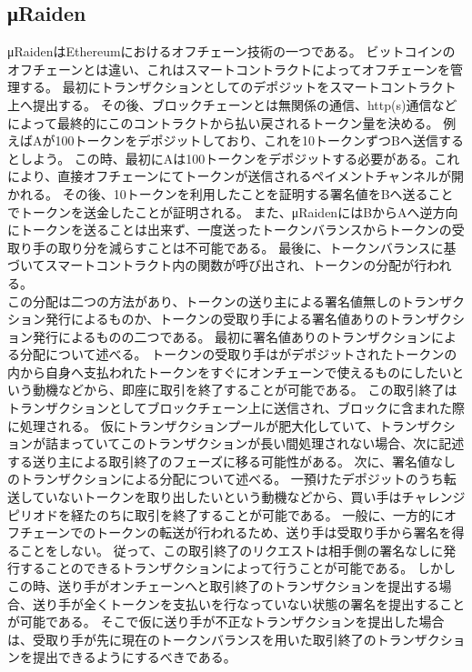 \subsection{μRaiden}
μRaidenはEthereumにおけるオフチェーン技術の一つである。
ビットコインのオフチェーンとは違い、これはスマートコントラクトによってオフチェーンを管理する。
最初にトランザクションとしてのデポジットをスマートコントラクト上へ提出する。
その後、ブロックチェーンとは無関係の通信、http(s)通信などによって最終的にこのコントラクトから払い戻されるトークン量を決める。
例えばAが100トークンをデポジットしており、これを10トークンずつBへ送信するとしよう。
この時、最初にAは100トークンをデポジットする必要がある。これにより、直接オフチェーンにてトークンが送信されるペイメントチャンネルが開かれる。
その後、10トークンを利用したことを証明する署名値をBへ送ることでトークンを送金したことが証明される。
また、μRaidenにはBからAへ逆方向にトークンを送ることは出来ず、一度送ったトークンバランスからトークンの受取り手の取り分を減らすことは不可能である。
最後に、トークンバランスに基づいてスマートコントラクト内の関数が呼び出され、トークンの分配が行われる。 \\
この分配は二つの方法があり、トークンの送り主による署名値無しのトランザクション発行によるものか、トークンの受取り手による署名値ありのトランザクション発行によるものの二つである。
最初に署名値ありのトランザクションによる分配について述べる。
トークンの受取り手はがデポジットされたトークンの内から自身へ支払われたトークンをすぐにオンチェーンで使えるものにしたいという動機などから、即座に取引を終了することが可能である。
この取引終了はトランザクションとしてブロックチェーン上に送信され、ブロックに含まれた際に処理される。
仮にトランザクションプールが肥大化していて、トランザクションが詰まっていてこのトランザクションが長い間処理されない場合、次に記述する送り主による取引終了のフェーズに移る可能性がある。
次に、署名値なしのトランザクションによる分配について述べる。
一預けたデポジットのうち転送していないトークンを取り出したいという動機などから、買い手はチャレンジピリオドを経たのちに取引を終了することが可能である。
一般に、一方的にオフチェーンでのトークンの転送が行われるため、送り手は受取り手から署名を得ることをしない。
従って、この取引終了のリクエストは相手側の署名なしに発行することのできるトランザクションによって行うことが可能である。
しかしこの時、送り手がオンチェーンへと取引終了のトランザクションを提出する場合、送り手が全くトークンを支払いを行なっていない状態の署名を提出することが可能である。
そこで仮に送り手が不正なトランザクションを提出した場合は、受取り手が先に現在のトークンバランスを用いた取引終了のトランザクションを提出できるようにするべきである。
